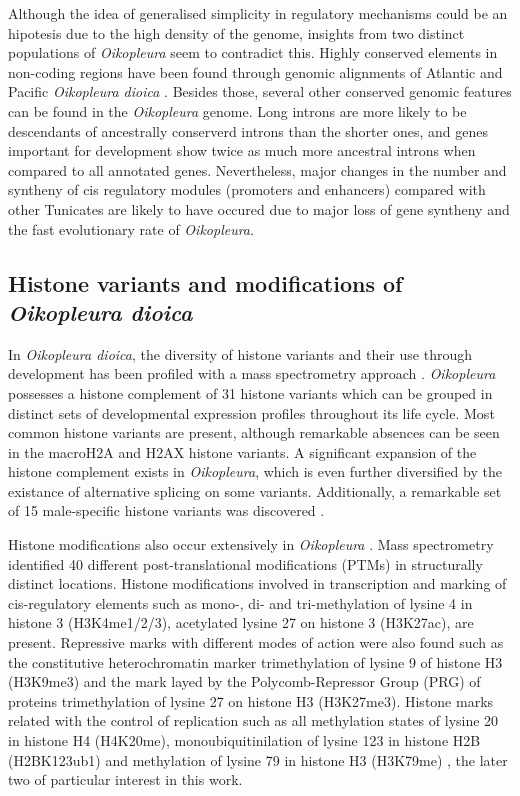 \documentclass[11pt,twoside,a4paper]{report}
\begin{document}
		Although the idea of generalised simplicity in regulatory mechanisms could be an hipotesis due to the high density of the genome, insights from two distinct populations of \textit{Oikopleura} seem to contradict this. Highly conserved elements in non-coding regions have been found through genomic alignments of Atlantic and Pacific \textit{Oikopleura dioica} \cite{Denoeud2010}. Besides those, several other conserved genomic features can be found in the \textit{Oikopleura} genome. 	Long introns are more likely to be descendants of ancestrally conserverd introns than the shorter ones, and genes important for development show twice as much more ancestral introns when compared to all annotated genes. Nevertheless, major changes in the number and syntheny of cis regulatory modules (promoters and enhancers) compared with other Tunicates are likely to have occured due to major loss of gene syntheny and the fast evolutionary rate of \textit{Oikopleura}.
		
		\subsection{Histone variants and modifications of \textit{Oikopleura dioica}}
		In \textit{Oikopleura dioica}, the diversity of histone variants and their use through development has been profiled with a mass spectrometry approach \cite{Moosmann2011}. \textit{Oikopleura} possesses a histone complement of 31 histone variants which can be grouped in distinct sets of developmental expression profiles throughout its life cycle. Most common histone variants are present, although remarkable absences can be seen in the macroH2A and H2AX histone variants. A significant expansion of the histone complement exists in \textit{Oikopleura}, which is even further diversified by the existance of alternative splicing on some variants. Additionally, a remarkable set of 15 male-specific histone variants was discovered \cite{Moosmann2011}.
		
		Histone modifications also occur extensively in \textit{Oikopleura} \cite{Moosmann2011}.	Mass spectrometry identified 40 different post-translational modifications (PTMs) in structurally distinct locations. Histone modifications involved in transcription and marking of cis-regulatory elements such as mono-, di- and tri-methylation of lysine 4 in histone 3 (H3K4me1/2/3), acetylated lysine 27 on histone 3 (H3K27ac), are present. 
		Repressive marks with different modes of action were also found such as the constitutive heterochromatin marker trimethylation of lysine 9 of histone H3 (H3K9me3) and the mark layed by the Polycomb-Repressor Group (PRG) of proteins trimethylation of lysine 27 on histone H3 (H3K27me3). Histone marks related with the control of replication such as all methylation states of lysine 20 in histone H4 (H4K20me), monoubiquitinilation of lysine 123 in histone H2B (H2BK123ub1) and methylation of lysine 79 in histone H3 (H3K79me) , the later two of particular interest in this work.
		
\end{document}
